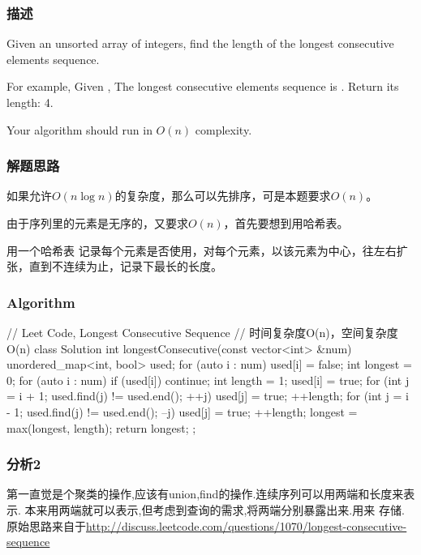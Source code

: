 \subsubsection{描述}
Given an unsorted array of integers, find the length of the longest consecutive 
elements sequence.

For example,
Given \code{[100, 4, 200, 1, 3, 2]},
The longest consecutive elements sequence is \code{[1, 2, 3, 4]}. Return its 
length: 4.

Your algorithm should run in $O(n)$ complexity.


\subsubsection{解题思路}
如果允许$O(n \log n)$的复杂度，那么可以先排序，可是本题要求$O(n)$。

由于序列里的元素是无序的，又要求$O(n)$，首先要想到用哈希表。

用一个哈希表 记录每个元素是否使用，对每个元素，以该元素为中心，往左右扩张，直到不连续为止，记录下最长的长度。


\subsubsection{Algorithm}
\begin{Code}
	// Leet Code, Longest Consecutive Sequence
	// 时间复杂度O(n)，空间复杂度O(n)
	class Solution {
		int longestConsecutive(const vector<int> &num) {
			unordered_map<int, bool> used;
			for (auto i : num) used[i] = false;
			int longest = 0;
			for (auto i : num) {
				if (used[i]) continue;
				int length = 1;
				used[i] = true;
				for (int j = i + 1; used.find(j) != used.end(); ++j) {
					used[j] = true;
					++length;
				}
				for (int j = i - 1; used.find(j) != used.end(); --j) {
					used[j] = true;
					++length;
				}
				longest = max(longest, length);
			}
			return longest;
		}
	};
\end{Code}

\subsubsection{分析2}
第一直觉是个聚类的操作,应该有union,find的操作.连续序列可以用两端和长度来表示.
本来用两端就可以表示,但考虑到查询的需求,将两端分别暴露出来.用来
存储.原始思路来自于\url{http://discuss.leetcode.com/questions/1070/longest-consecutive-sequence}

